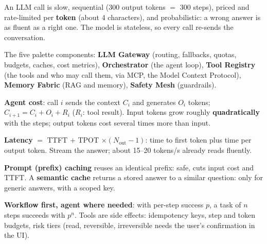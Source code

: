 \stages{\stEstimate\ \stDesign\ \stDeep}

\begin{know}
  \item An LLM call is slow, sequential (300 output tokens $=$ 300 steps), priced and rate-limited per \textbf{token} (about 4 characters), and probabilistic: a wrong answer is as fluent as a right one. The model is stateless, so every call re-sends the conversation.
  \item The five palette components: \textbf{LLM Gateway} (routing, fallbacks, quotas, budgets, caches, cost metrics), \textbf{Orchestrator} (the agent loop), \textbf{Tool Registry} (the tools and who may call them, via MCP, the Model Context Protocol), \textbf{Memory Fabric} (RAG and memory), \textbf{Safety Mesh} (guardrails).
  \item \textbf{Agent cost}: call $i$ sends the context $C_i$ and generates $O_i$ tokens; $C_{i+1} = C_i + O_i + R_i$ ($R_i$: tool result). Input tokens grow roughly \textbf{quadratically} with the steps; output tokens cost several times more than input.
  \item \textbf{Latency} $=$ TTFT $+$ TPOT $\times (N_\text{out} - 1)$: time to first token plus time per output token. Stream the answer; about 15--20 tokens/s already reads fluently.
  \item \textbf{Prompt (prefix) caching} reuses an identical prefix: safe, cuts input cost and TTFT. A \textbf{semantic cache} returns a stored answer to a similar question: only for generic answers, with a scoped key.
  \item \textbf{Workflow first, agent where needed}: with per-step success $p$, a task of $n$ steps succeeds with $p^n$. Tools are side effects: idempotency keys, step and token budgets, risk tiers (read, reversible, irreversible needs the user's confirmation in the UI).

\end{know}

